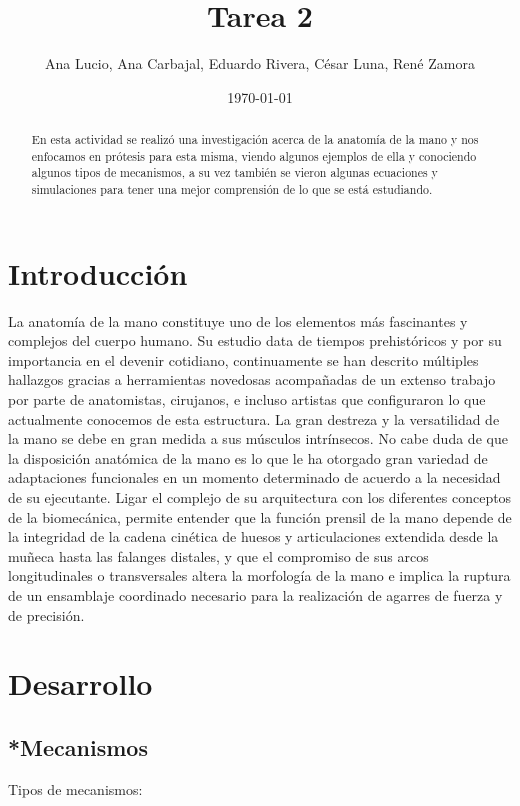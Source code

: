 \documentclass{article}
\author{Ana Lucio,
Ana Carbajal,
Eduardo Rivera,
César Luna,
René Zamora} %
\title{Tarea 2} %
\date{\today}
\begin{document}

\maketitle %
\begin{abstract} %
En esta actividad se realizó una investigación acerca de la anatomía de la mano y nos enfocamos en prótesis para esta misma, viendo algunos ejemplos de ella y conociendo algunos tipos de mecanismos, a su vez también se vieron algunas ecuaciones y simulaciones para tener una mejor comprensión de lo que se está estudiando.
\end{abstract}

\section{Introducción}\label{intro} %
La anatomía de la mano constituye uno de los elementos más fascinantes y complejos del  cuerpo  humano. Su estudio data de tiempos prehistóricos y por su importancia en el devenir cotidiano, continuamente se han descrito  múltiples hallazgos gracias a herramientas novedosas acompañadas de un  extenso trabajo por parte de anatomistas, cirujanos, e incluso artistas que configuraron lo que actualmente conocemos de esta estructura\cite{2}.
La gran destreza y la versatilidad de la mano se debe en gran medida a sus músculos intrínsecos. No cabe duda de que la disposición  anatómica de la mano es lo que le ha otorgado gran variedad de adaptaciones funcionales en  un momento determinado de acuerdo a la necesidad de su  ejecutante. 
Ligar el complejo de su arquitectura con los diferentes conceptos de la biomecánica, permite entender que la función prensil \cite{1} de la mano depende de la integridad de la cadena cinética de huesos y articulaciones extendida desde la muñeca hasta las falanges distales, y que el compromiso de sus arcos longitudinales o transversales altera la morfología de la mano e implica la ruptura de un ensamblaje coordinado necesario para la realización de agarres de fuerza y de precisión.


\section{Desarrollo}


\subsection{\textbf{*Mecanismos}}
Tipos de mecanismos:
\end{document}
